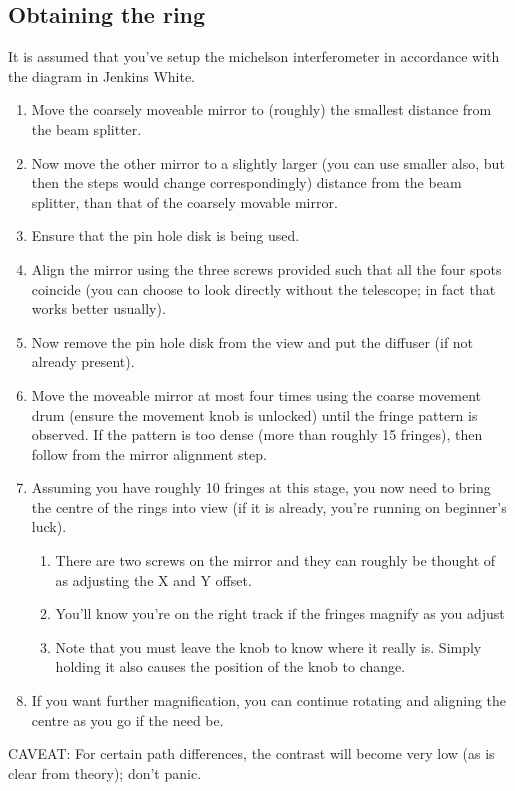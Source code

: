 	\subsection{Obtaining the ring}
		It is assumed that you've setup the michelson interferometer in accordance with the diagram in Jenkins White.
		\begin{enumerate}
			\item Move the coarsely moveable mirror to (roughly) the smallest distance from the beam splitter.
			\item Now move the other mirror to a slightly larger (you can use smaller also, but then the steps would change correspondingly) distance from the beam splitter, than that of the coarsely movable mirror.
			\item Ensure that the pin hole disk is being used.
			\item Align the mirror using the three screws provided such that all the four spots coincide (you can choose to look directly without the telescope; in fact that works better usually).
			\item Now remove the pin hole disk from the view and put the diffuser (if not already present).
			\item Move the moveable mirror at most four times using the coarse movement drum (ensure the movement knob is unlocked) until the fringe pattern is observed. If the pattern is too dense (more than roughly 15 fringes), then follow from the mirror alignment step.
			\item Assuming you have roughly 10 fringes at this stage, you now need to bring the centre of the rings into view (if it is already, you're running on beginner's luck).
			\begin{enumerate}
				\item There are two screws on the mirror and they can roughly be thought of as adjusting the X and Y offset.
				\item You'll know you're on the right track if the fringes magnify as you adjust
				\item Note that you must leave the knob to know where it really is. Simply holding it also causes the position of the knob to change.
			\end{enumerate}
			\item If you want further magnification, you can continue rotating and aligning the centre as you go if the need be.
		\end{enumerate}
		CAVEAT: For certain path differences, the contrast will become very low (as is clear from theory); don't panic.

